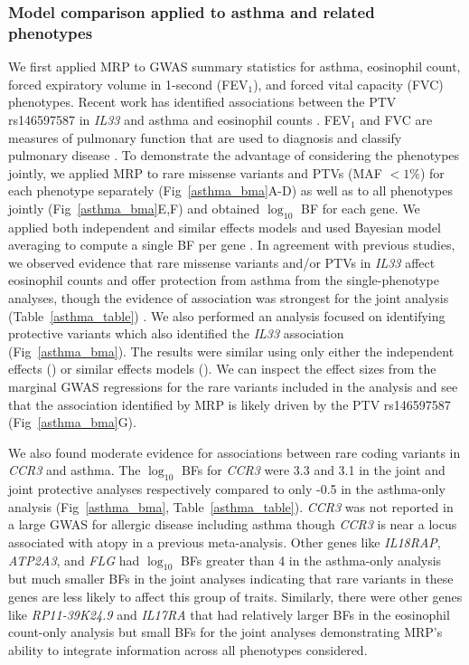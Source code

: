 \subsubsection*{Model comparison applied to asthma and related phenotypes}
We first applied MRP to GWAS summary statistics for asthma, eosinophil count, forced expiratory volume in 1-second (FEV$_1$), and forced vital capacity (FVC) phenotypes. Recent work has identified associations between the PTV rs146597587 in \textit{IL33} and asthma and eosinophil counts \cite{DeBoever179762, 10.1371/journal.pgen.1006659}. FEV$_1$ and FVC are measures of pulmonary function that are used to diagnosis and classify pulmonary disease \cite{Swanney1046}. To demonstrate the advantage of considering the phenotypes jointly, we applied MRP to rare missense variants and PTVs (MAF $< 1\%$) for each phenotype separately (Fig~\ref{asthma_bma}A-D) as well as to all phenotypes jointly (Fig~\ref{asthma_bma}E,F) and obtained $\log_{10}$ BF for each gene. We applied both independent and similar effects models and used Bayesian model averaging to compute a single BF per gene \cite{10.2307/2676803}. In agreement with previous studies, we observed evidence that rare missense variants and/or PTVs in \textit{IL33} affect eosinophil counts and offer protection from asthma from the single-phenotype analyses, though the evidence of association was strongest for the joint analysis (Table~\ref{asthma_table}) \cite{DeBoever179762, 10.1371/journal.pgen.1006659}. We also performed an analysis focused on identifying protective variants which also identified the \textit{IL33} association (Fig~\ref{asthma_bma}). The results were similar using only either the independent effects () or similar effects models (). We can inspect the effect sizes from the marginal GWAS regressions for the rare variants included in the analysis and see that the association identified by MRP is likely driven by the PTV rs146597587 (Fig~\ref{asthma_bma}G). 

We also found moderate evidence for associations between rare coding variants in \textit{CCR3} and asthma. The $\log_{10}$ BFs for \textit{CCR3} were 3.3 and 3.1 in the joint and joint protective analyses respectively compared to only -0.5 in the asthma-only analysis  (Fig~\ref{asthma_bma}, Table~\ref{asthma_table}). \textit{CCR3} was not reported in a large GWAS for allergic disease including asthma\cite{Ferreira:2017ba} though \textit{CCR3} is near a locus associated with atopy in a previous meta-analysis\cite{Ober:2011jk}. Other genes like \textit{IL18RAP}, \textit{ATP2A3}, and \textit{FLG} had $\log_{10}$ BFs greater than 4 in the asthma-only analysis but much smaller BFs in the joint analyses indicating that rare variants in these genes are less likely to affect this group of traits. Similarly, there were other genes like \textit{RP11-39K24.9} and \textit{IL17RA} that had relatively larger BFs in the eosinophil count-only analysis but small BFs for the joint analyses demonstrating MRP's ability to integrate information across all phenotypes considered.

